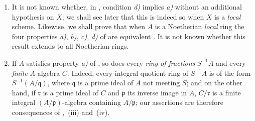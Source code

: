 \begin{remarks}[5.11.7]
\label{IV.5.11.7}
\begin{enumerate}[{\rm(i)}]
  \item It is not known whether, in , condition
  \emph{d)} implies \emph{a)} without an additional hypothesis on $X$;
  we shall see later  that this is indeed so when $X$
  is a \emph{local} scheme.  Likewise, we shall prove that when $A$ is
  a Noetherian \emph{local} ring the four properties \emph{a)},
  \emph{b)}, \emph{c)}, \emph{d)} of  are equivalent
  .  It is not known whether this result extends to all
  Noetherian rings.

  \item If $A$ satisfies property \emph{a)} of
  , so does every \emph{ring of fractions} $S^{-1}A$
  and every \emph{finite} $A$-algebra $C$.  Indeed, every integral
  quotient ring of $S^{-1}A$ is of the form $S^{-1}(A/\mathfrak q)$,
  where $\mathfrak q$ is a prime ideal of $A$ not meeting $S$; and on
  the other hand, if $\mathfrak r$ is a prime ideal of $C$ and
  $\mathfrak p$ its inverse image in $A$, $C/\mathfrak r$ is a finite
  integral $(A/\mathfrak p)$-algebra containing $A/\mathfrak p$; our
  assertions are therefore consequences of
  ,~(iii) and~(iv).
\end{enumerate}
\end{remarks}
